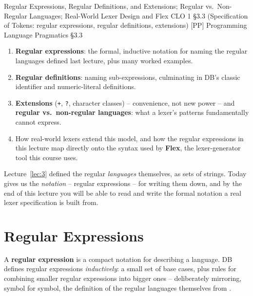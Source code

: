 \documentclass[full-course-notes.tex]{subfiles}
\begin{document}
  {Regular Expressions, Regular Definitions, and Extensions; Regular vs.\ Non-Regular
   Languages; Real-World Lexer Design and Flex}
  {CLO 1}
  {\S3.3 (Specification of Tokens: regular expressions, regular definitions, extensions)}
  {[PP] Programming Language Pragmatics \S3.3}
\setcounter{section}{0}
\makelecturetitle

\begin{coreidea}
\begin{enumerate}
  \item \textbf{Regular expressions}: the formal, inductive notation for naming the regular
  languages defined last lecture, plus many worked examples.
  \item \textbf{Regular definitions}: naming sub-expressions, culminating in DB's classic
  identifier and numeric-literal definitions.
  \item \textbf{Extensions} (\texttt{+}, \texttt{?}, character classes) -- convenience, not new
  power -- and \textbf{regular vs.\ non-regular languages}: what a lexer's patterns
  fundamentally cannot express.
  \item How real-world lexers extend this model, and how the regular expressions in this
  lecture map directly onto the syntax used by \textbf{Flex}, the lexer-generator tool this
  course uses.
\end{enumerate}
Lecture~\ref{lec:3} defined the regular \emph{languages} themselves, as sets of strings. Today
gives us the \emph{notation} -- regular expressions -- for writing them down, and by the end of
this lecture you will be able to read and write the formal notation a real lexer specification
is built from.
\end{coreidea}

\section{Regular Expressions}
\label{sec:l4-regular-expressions}

\dbtag A \textbf{regular expression} is a compact notation for describing a language. DB
defines regular expressions \emph{inductively}: a small set of base cases, plus rules for
combining smaller regular expressions into bigger ones -- deliberately mirroring, symbol for
symbol, the definition of the regular languages themselves from
.
\end{document}

